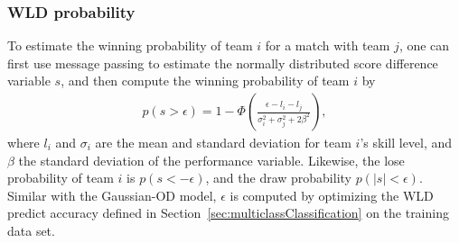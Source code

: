 \subsubsection{WLD probability} 
To estimate the winning probability of team $i$ for a match with team $j$, one can first use message passing to estimate the normally distributed score difference variable $s$, and then compute the winning probability of team $i$ by
\begin{align}
  p(s>\epsilon) = 1 -
  \Phi\left(\frac{\epsilon-l_i-l_j}{\sigma_i^2+\sigma_j^2+2 \beta^2}\right),
\end{align}
where $l_i$ and $\sigma_i$ are the mean and standard deviation for
team $i$'s skill level, and $\beta$ the standard deviation of the
performance variable. Likewise, the lose probability of team $i$ is $p(s<-\epsilon)$, and the draw probability $p(|s|<\epsilon)$. Similar with the Gaussian-OD model, $\epsilon$ is computed by optimizing the WLD predict accuracy defined in Section~\ref{sec:multiclassClassification} on the training data set. 

